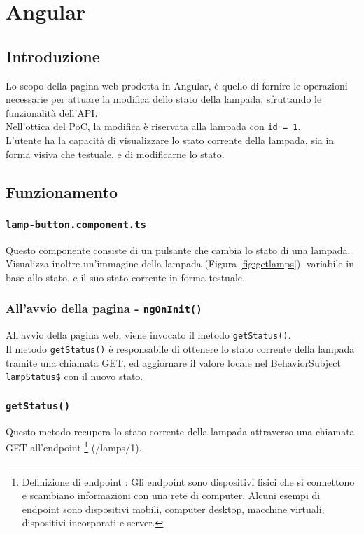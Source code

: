 \chapter{Angular}\label{angular}

\section{Introduzione}

Lo scopo della pagina web prodotta in Angular, è quello di fornire le operazioni necessarie per attuare la modifica dello stato della lampada, sfruttando le funzionalità dell'API. \\
Nell'ottica del PoC, la modifica è riservata alla lampada con \texttt{id = 1}. \\
L'utente ha la capacità di visualizzare lo stato corrente della lampada, sia in forma visiva che testuale, e di modificarne lo stato. 

\section{Funzionamento}

\subsection{\texttt{lamp-button.component.ts}}
Questo componente consiste di un pulsante che cambia lo stato di una lampada. Visualizza inoltre un'immagine della lampada (Figura \ref{fig:getlamps}), variabile in base allo stato, e il suo stato corrente in forma testuale.

\subsection{All'avvio della pagina - \texttt{ngOnInit()}}
All'avvio della pagina web, viene invocato il metodo \texttt{getStatus()}.\\
Il metodo \texttt{getStatus()} è responsabile di ottenere lo stato corrente della lampada tramite una chiamata GET, ed aggiornare il valore locale nel BehaviorSubject \texttt{lampStatus\$} con il nuovo stato.

\subsection{\texttt{getStatus()}}
Questo metodo recupera lo stato corrente della lampada attraverso una chiamata GET all'endpoint \footnote[1]{Definizione di endpoint : 
Gli endpoint sono dispositivi fisici che si connettono e scambiano informazioni con una rete di computer. Alcuni esempi di endpoint sono dispositivi mobili, computer desktop, macchine virtuali, dispositivi incorporati e server.} (/lamps/1). \\

